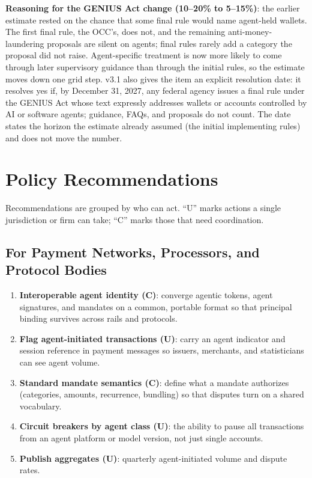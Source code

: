 \documentclass[11pt,letterpaper]{article}
\begin{document}
\textbf{Reasoning for the GENIUS Act change (10--20\% to 5--15\%)}: the earlier estimate rested on the chance that some final rule would name agent-held wallets. The first final rule, the OCC's, does not, and the remaining anti-money-laundering proposals are silent on agents; final rules rarely add a category the proposal did not raise. Agent-specific treatment is now more likely to come through later supervisory guidance than through the initial rules, so the estimate moves down one grid step. v3.1 also gives the item an explicit resolution date: it resolves yes if, by December 31, 2027, any federal agency issues a final rule under the GENIUS Act whose text expressly addresses wallets or accounts controlled by AI or software agents; guidance, FAQs, and proposals do not count. The date states the horizon the estimate already assumed (the initial implementing rules) and does not move the number.

\section{Policy Recommendations}
\label{sec:policy}

Recommendations are grouped by who can act. ``U'' marks actions a single jurisdiction or firm can take; ``C'' marks those that need coordination.

\subsection{For Payment Networks, Processors, and Protocol Bodies}

\begin{policybox}
\begin{enumerate}
  \item \textbf{Interoperable agent identity (C)}: converge agentic tokens, agent signatures, and mandates on a common, portable format so that principal binding survives across rails and protocols.
  \item \textbf{Flag agent-initiated transactions (U)}: carry an agent indicator and session reference in payment messages so issuers, merchants, and statisticians can see agent volume.
  \item \textbf{Standard mandate semantics (C)}: define what a mandate authorizes (categories, amounts, recurrence, bundling) so that disputes turn on a shared vocabulary.
  \item \textbf{Circuit breakers by agent class (U)}: the ability to pause all transactions from an agent platform or model version, not just single accounts.
  \item \textbf{Publish aggregates (U)}: quarterly agent-initiated volume and dispute rates.
\end{enumerate}
\end{policybox}
\end{document}
